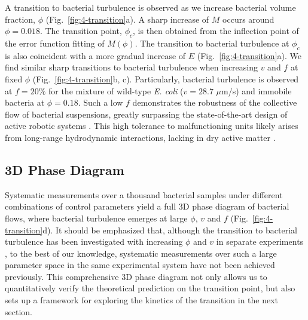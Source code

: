 A transition to bacterial turbulence is observed as we increase bacterial volume fraction, $\phi$ (Fig.~\ref{fig:4-transition}a). A sharp increase of $M$ occurs around $\phi = 0.018$. The transition point, $\phi_c$, is then obtained from the inflection point of the error function fitting of $M(\phi)$. The transition to bacterial turbulence at $\phi_c$ is also coincident with a more gradual increase of $E$ (Fig.~\ref{fig:4-transition}a).
We find similar sharp transitions to bacterial turbulence when increasing $v$ and $f$ at fixed $\phi$ (Fig.~\ref{fig:4-transition}b, c).
Particularly, bacterial turbulence is observed at $f = 20\%$ for the mixture of wild-type \textit{E. coli} ($v = 28.7$ $\mu$m/s) and immobile bacteria at $\phi = 0.18$. Such a low $f$ demonstrates the robustness of the collective flow of bacterial suspensions, greatly surpassing the state-of-the-art design of active robotic systems \cite{Li2019a}.
This high tolerance to malfunctioning units likely arises from long-range hydrodynamic interactions, lacking in dry active matter \cite{Marchetti2013}.

\subsection{3D Phase Diagram}
Systematic measurements over a thousand bacterial samples under different combinations of control parameters yield a full 3D phase diagram of bacterial flows, where bacterial turbulence emerges at large $\phi$, $v$ and $f$ (Fig.~\ref{fig:4-transition}d).
It should be emphasized that, although the transition to bacterial turbulence has been investigated with increasing $\phi$ and $v$ in separate experiments \cite{Cisneros2011, Sokolov2007, Sokolov2009, Sokolov2012, Ryan2013}, to the best of our knowledge, systematic measurements over such a large parameter space in the same experimental system have not been achieved previously. This comprehensive 3D phase diagram not only allows us to quantitatively verify the theoretical prediction on the transition point, but also sets up a framework for exploring the kinetics of the transition in the next section.

